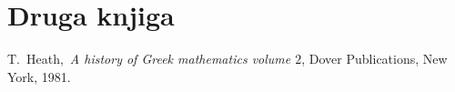 \documentclass[a4paper, 10pt]{article}
\begin{document}
	\section{Druga knjiga}
	
	\begin{thebibliography}{99}
		
		 T.~Heath,~\emph{A history of Greek mathematics volume $2$}, Dover Publications, New York, 1981.
		
	\end{thebibliography}
\end{document}
